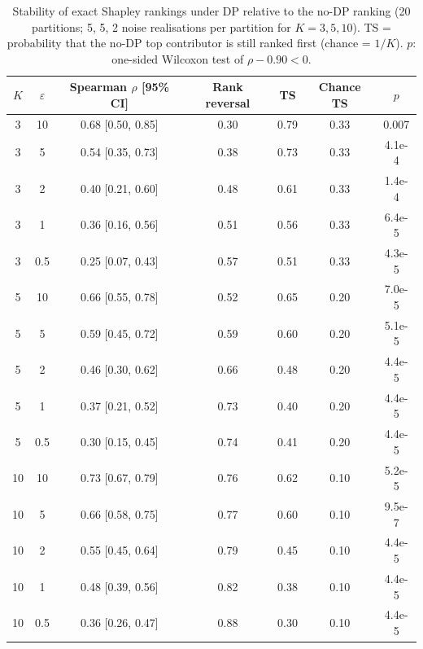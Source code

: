 \begin{table}[t]
\caption{Stability of exact Shapley rankings under DP relative to the no-DP ranking (20 partitions; 5, 5, 2 noise realisations per partition for $K=3, 5, 10$). TS = probability that the no-DP top contributor is still ranked first (chance = $1/K$). $p$: one-sided Wilcoxon test of $\rho-0.90<0$.}
\centering\small
\begin{tabular}{ccccccc}
\toprule
$K$ & $\varepsilon$ & Spearman $\rho$ [95\% CI] & Rank reversal & TS & Chance TS & $p$ \\
\midrule
3 & 10 & 0.68 [0.50, 0.85] & 0.30 & 0.79 & 0.33 & 0.007 \\
3 & 5 & 0.54 [0.35, 0.73] & 0.38 & 0.73 & 0.33 & 4.1e-4 \\
3 & 2 & 0.40 [0.21, 0.60] & 0.48 & 0.61 & 0.33 & 1.4e-4 \\
3 & 1 & 0.36 [0.16, 0.56] & 0.51 & 0.56 & 0.33 & 6.4e-5 \\
3 & 0.5 & 0.25 [0.07, 0.43] & 0.57 & 0.51 & 0.33 & 4.3e-5 \\
\midrule
5 & 10 & 0.66 [0.55, 0.78] & 0.52 & 0.65 & 0.20 & 7.0e-5 \\
5 & 5 & 0.59 [0.45, 0.72] & 0.59 & 0.60 & 0.20 & 5.1e-5 \\
5 & 2 & 0.46 [0.30, 0.62] & 0.66 & 0.48 & 0.20 & 4.4e-5 \\
5 & 1 & 0.37 [0.21, 0.52] & 0.73 & 0.40 & 0.20 & 4.4e-5 \\
5 & 0.5 & 0.30 [0.15, 0.45] & 0.74 & 0.41 & 0.20 & 4.4e-5 \\
\midrule
10 & 10 & 0.73 [0.67, 0.79] & 0.76 & 0.62 & 0.10 & 5.2e-5 \\
10 & 5 & 0.66 [0.58, 0.75] & 0.77 & 0.60 & 0.10 & 9.5e-7 \\
10 & 2 & 0.55 [0.45, 0.64] & 0.79 & 0.45 & 0.10 & 4.4e-5 \\
10 & 1 & 0.48 [0.39, 0.56] & 0.82 & 0.38 & 0.10 & 4.4e-5 \\
10 & 0.5 & 0.36 [0.26, 0.47] & 0.88 & 0.30 & 0.10 & 4.4e-5 \\
\bottomrule
\end{tabular}
\label{tab:wilcoxon_results}
\end{table}
